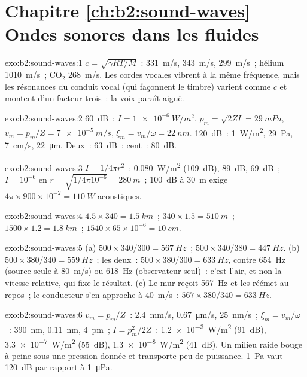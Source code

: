 \section*{Chapitre \ref{ch:b2:sound-waves} --- Ondes sonores dans les fluides}

\begin{solution}{exo:b2:sound-waves:1}
$c = \sqrt{\gamma RT/M}$~: \qty{331}{m/s}, \qty{343}{m/s}, \qty{299}{m/s}~; hélium
\qty{1010}{m/s}~; CO$_2$ \qty{268}{m/s}. Les cordes vocales vibrent à la même
fréquence, mais les résonances du conduit vocal (qui façonnent le
timbre) varient comme $c$ et montent d'un facteur trois~: la voix paraît
aiguë.
\end{solution}

\begin{solution}{exo:b2:sound-waves:2}
\qty{60}{dB}~: $I = \qty{1e-6}{W/m^2}$, $p_m = \sqrt{2ZI} = \qty{29}{mPa}$, $v_m = p_m/Z =
\qty{7e-5}{m/s}$, $\xi_m = v_m/\omega = \qty{22}{nm}$. \qty{120}{dB}~: \qty{1}{W/m^2},
\qty{29}{Pa}, \qty{7}{cm/s}, \qty{22}{\micro m}. Deux~: \qty{63}{dB}~; cent~: \qty{80}{dB}.
\end{solution}

\begin{solution}{exo:b2:sound-waves:3}
$I = 1/4\pi r^2$~: \qty{0.080}{W/m^2} (\qty{109}{dB}), \qty{89}{dB}, \qty{69}{dB}~; $I = 10^{-6}$
en $r = \sqrt{1/4\pi10^{-6}} = \qty{280}{m}$~; \qty{100}{dB} à \qty{30}{m} exige $4\pi \times
900 \times 10^{-2} = \qty{110}{W}$ acoustiques.
\end{solution}

\begin{solution}{exo:b2:sound-waves:4}
$4.5 \times 340 = \qty{1.5}{km}$~; $340 \times 1.5 = \qty{510}{m}$~; $1500 \times 1.2 = \qty{1.8}{km}$~;
$1540 \times 65 \times 10^{-6} = \qty{10}{cm}$.
\end{solution}

\begin{solution}{exo:b2:sound-waves:5}
(a) $500 \times 340/300 = \qty{567}{Hz}$~; $500 \times 340/380 = \qty{447}{Hz}$. (b) $500 \times
380/340 = \qty{559}{Hz}$~; les deux~: $500 \times 380/300 = \qty{633}{Hz}$, contre \qty{654}{Hz}
(source seule à \qty{80}{m/s}) ou \qty{618}{Hz} (observateur seul)~: c'est l'air, et non
la vitesse relative, qui fixe le résultat. (c) Le mur reçoit \qty{567}{Hz}
et les réémet au repos~; le conducteur s'en approche à \qty{40}{m/s}~: $567 \times
380/340 = \qty{633}{Hz}$.
\end{solution}

\begin{solution}{exo:b2:sound-waves:6}
$v_m = p_m/Z$~: \qty{2.4}{mm/s}, \qty{0.67}{\micro m/s}, \qty{25}{nm/s}~; $\xi_m = v_m/\omega$~:
\qty{390}{nm}, \qty{0.11}{nm}, \qty{4}{pm}~; $I = p_m^2/2Z$~: \qty{1.2e-3}{W/m^2} (\qty{91}{dB}),
\qty{3.3e-7}{W/m^2} (\qty{55}{dB}), \qty{1.3e-8}{W/m^2} (\qty{41}{dB}). Un milieu raide
bouge à peine sous une pression donnée et transporte peu de puissance.
\qty{1}{Pa} vaut \qty{120}{dB} par rapport à \qty{1}{\micro Pa}.
\end{solution}

